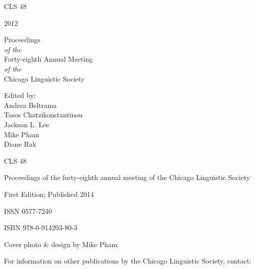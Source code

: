 \documentclass[12pt]{article}
\renewcommand{\huge}{\fontsize{42}{46}\selectfont}
\renewcommand{\LARGE}{\fontsize{28}{31}\selectfont}
\renewcommand{\Large}{\fontsize{24}{27}\selectfont}
\renewcommand{\large}{\fontsize{20}{31}\selectfont}
\begin{document}

\begin{center}

{\huge CLS 48\\ 
 
\vspace{5mm}
 
 2012}
 
 \vspace{.9in}
 
 {\LARGE Proceedings}\\
 {\itshape \large of the}\\
 {\LARGE Forty-eighth Annual Meeting}\\
 {\itshape \large of the}\\ 
 {\LARGE Chicago Linguistic Society} 

 \vspace{.9in}
 
 {\large Edited by:}\\
 {\Large Andrea Beltrama \\ Tasos Chatzikonstantinou \\ Jackson L. Lee \\ Mike Pham \\ Diane Rak\\\mbox{}}
 
\end{center}

\newpage



\mbox{}\vfill

CLS 48

Proceedings of the forty-eighth annual meeting of the Chicago Linguistic Society

\vspace{2em}

First Edition; Published 2014

\vspace{2em}

ISSN 0577-7240

ISBN 978-0-914203-80-3

\vspace{2em}

Cover photo \& design by Mike Pham

\vspace{2em}

For information on other publications by the Chicago Linguistic Society, contact:
\end{document}
